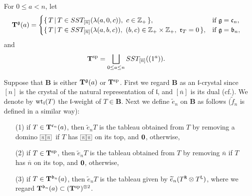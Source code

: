 \documentclass[leqno,11pt]{amsart}
\numberwithin{equation}{section}
\newcommand{\B}{\mathbf{B}}
\newcommand{\ov}{\overline}
\newcommand{\Z}{\mathbb{Z}}
\newcommand{\te}{\widetilde{e}}
\newcommand{\tf}{\widetilde{f}}
\newcommand{\mf}{\mathfrak}
\newcommand{\la}{\lambda}
\begin{document}
For $0\leq a< n$, let
\begin{equation*}
{\bf T}^{{\mf g}}(a)=
\begin{cases}
\{\,T\,|\,T\in SST_{[\ov{n}]}(\la(a,0,c)), \ c\in \Z_+ \,\}, & \text{if $\mf g=\mf c_n$},\\
\{\,T\,|\,T\in SST_{[\ov{n}]}(\la(a,b,c)), \  (b,c)\in \Z_+\times  \Z_+, \  {\mf r}_T=0\,\},
 & \text{if $\mf g=\mf b_n$},
\end{cases}
\end{equation*}
and 
\begin{equation*}
{\bf T}^{\rm sp}= \bigsqcup_{0\leq a\leq n} SST_{[\ov{n}]}((1^a)).
\end{equation*}

Suppose that $\B$ is either ${\bf T}^{{\mf g}}(a)$ or ${\bf T}^{\rm sp}$.
First we regard $\B$ as an $\mf l$-crystal since $[n]$ is the crystal of the natural representation of $\mf l$, and  $[\ov{n}]$ is its dual (cf.\cite{KashNaka}). 
We denote by ${\rm wt}_{\mf l}(T)$ the ${\mf l}$-weight of $T\in \B$.
Next we define $\te_n$ on $\B$ as follows ($\tf_n$ is defined in a similar way):
\begin{itemize}
\item[(1)] if $T\in {\bf T}^{\mf c_n}(a)$, then $\te_n T$ is the tableau obtained from $T$ by removing a domino
$\resizebox{.05\hsize}{!}{\def\lr#1{\multicolumn{1}{|@{\hspace{.6ex}}c@{\hspace{.6ex}}|}{\raisebox{-.25ex}{$#1$}}}\raisebox{-.65ex}
{$\begin{array}[b]{cc}
\cline{1-1}\cline{2-2}
\lr{\ov{n}}&\lr{\ov{n}}\\
\cline{1-1}\cline{2-2}
\end{array}$}}$\ if $T$ has $\resizebox{.05\hsize}{!}{\def\lr#1{\multicolumn{1}{|@{\hspace{.6ex}}c@{\hspace{.6ex}}|}{\raisebox{-.25ex}{$#1$}}}\raisebox{-.65ex}
{$\begin{array}[b]{cc}
\cline{1-1}\cline{2-2}
\lr{\ov{n}}&\lr{\ov{n}}\\
\cline{1-1}\cline{2-2}
\end{array}$}}$ on its top, and ${\bf 0}$, otherwise,

\item[(2)] if $T\in {\bf T}^{\rm sp}$, then
$\te_n T$ is the tableau obtained from $T$ by removing  $\boxed{\ov{n}}$ if $T$ has $\boxed{\ov{n}}$ on its top, and ${\bf 0}$, otherwise, 


\item[(3)] if $T\in {\bf T}^{\mf b_n}(a)$, then $\te_n T$ is the tableau given by $\te_n(T^{\tt R}\otimes T^{\tt L})$, where we regard ${\bf T}^{\mf b_n}(a)\subset ({\bf T}^{\rm sp})^{\otimes 2}$.
\end{itemize}
\end{document}
